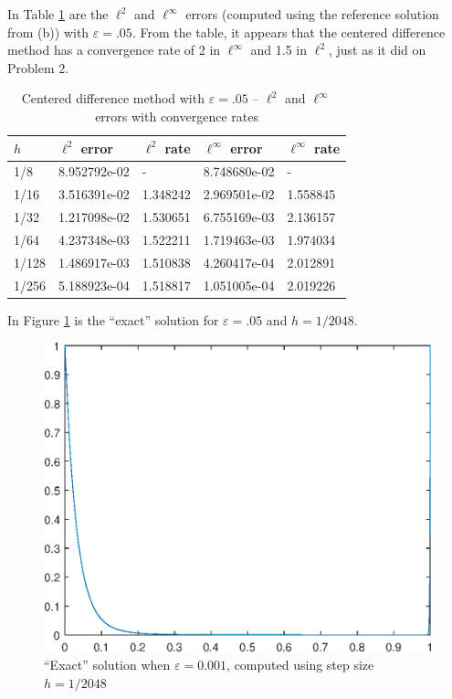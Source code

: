 \documentclass{homework}
\begin{document}
\begin{alphaparts}
		\questionpart In Table \ref{tab:p3c} are the $\ell^2$ and $\ell^\infty$ errors (computed using the reference solution from (b)) with $\varepsilon = .05$. From the table, it appears that the centered difference method has a convergence rate of 2 in $\ell^\infty$ and 1.5 in $\ell^2$, just as it did on Problem 2.
		
		\begin{table}[h]
			\centering
			\begin{tabular}{@{}lllll@{}}
				\toprule
				$h$ & $\ell^2$ error & $\ell^2$ rate & $\ell^\infty$ error & $\ell^\infty$ rate \\
				\midrule
				1/8 & 8.952792e-02 & - & 8.748680e-02 & -\\
				1/16 & 3.516391e-02 & 1.348242 & 2.969501e-02 & 1.558845\\
				1/32 & 1.217098e-02 & 1.530651 & 6.755169e-03 & 2.136157\\
				1/64 & 4.237348e-03 & 1.522211 & 1.719463e-03 & 1.974034\\
				1/128 & 1.486917e-03 & 1.510838 & 4.260417e-04 & 2.012891\\
				1/256 & 5.188923e-04 & 1.518817 & 1.051005e-04 & 2.019226\\
				\bottomrule
			\end{tabular}
			\caption{Centered difference method with $\varepsilon = .05$ -- $\ell^2$ and $\ell^\infty$ errors with convergence rates}
			\label{tab:p3c}
		\end{table}
		
		\questionpart In Figure \ref{fig:p3d} is the ``exact'' solution for $\varepsilon = .05$ and $h = 1/2048$.
		
		\begin{figure}
			\centering
			\includegraphics{p3d.eps}
			\caption{``Exact'' solution when $\varepsilon = 0.001$, computed using step size $h = 1/2048$}
			\label{fig:p3d}
		\end{figure}
		

\end{alphaparts}
\end{document}
